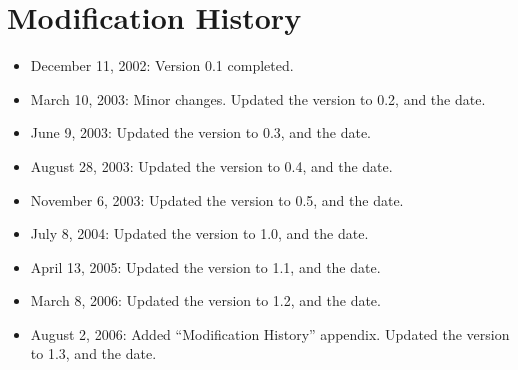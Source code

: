 \documentclass[11pt]{article}
\begin{document}
\appendix
\section{Modification History}

\begin{itemize}
  \item December 11, 2002: Version 0.1 completed.
  \item March 10, 2003: Minor changes. Updated the version to 0.2, and the
	date.
  \item June 9, 2003: Updated the version to 0.3, and the date.
  \item August 28, 2003: Updated the version to 0.4, and the date.
  \item November 6, 2003: Updated the version to 0.5, and the date.
  \item July 8, 2004: Updated the version to 1.0, and the date.
  \item April 13, 2005: Updated the version to 1.1, and the date.
  \item March 8, 2006: Updated the version to 1.2, and the date.
  \item August 2, 2006: Added ``Modification History'' appendix.
	Updated the version to 1.3, and the date.
\end{itemize}



\end{document}
